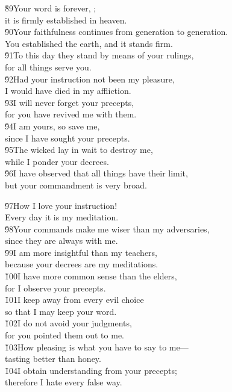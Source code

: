 \begin{poetry}
\poeml \v{89}Your word is forever, ; \\
\poemll    it is firmly established in heaven. \\
\poeml \v{90}Your faithfulness continues from generation to generation. \\
\poemll    You established the earth, and it stands firm. \\
\poeml \v{91}To this day they stand by means of your rulings, \\
\poemll    for all things serve you. \\
\poeml \v{92}Had your instruction not been my pleasure, \\
\poemll    I would have died in my affliction. \\
\poeml \v{93}I will never forget your precepts, \\
\poemll    for you have revived me with them. \\
\poeml \v{94}I am yours, so save me, \\
\poemll    since I have sought your precepts. \\
\poeml \v{95}The wicked lay in wait to destroy me, \\
\poemll    while I ponder your decrees. \\
\poeml \v{96}I have observed that all things have their limit, \\
\poemll    but your commandment is very broad.
\end{poetry}

\begin{poetry}
\poeml \v{97}How I love your instruction! \\
\poemll    Every day it is my meditation. \\
\poeml \v{98}Your commands make me wiser than my adversaries, \\
\poemll    since they are always with me. \\
\poeml \v{99}I am more insightful than my teachers, \\
\poemll    because your decrees are my meditations. \\
\poeml \v{100}I have more common sense than the elders, \\
\poemll    for I observe your precepts. \\
\poeml \v{101}I keep away from every evil choice \\
\poemll    so that I may keep your word. \\
\poeml \v{102}I do not avoid your judgments, \\
\poemll    for you pointed them out to me. \\
\poeml \v{103}How pleasing is what you have to say to me--- \\
\poemll    tasting better than honey. \\
\poeml \v{104}I obtain understanding from your precepts; \\
\poemll    therefore I hate every false way.
\end{poetry}

